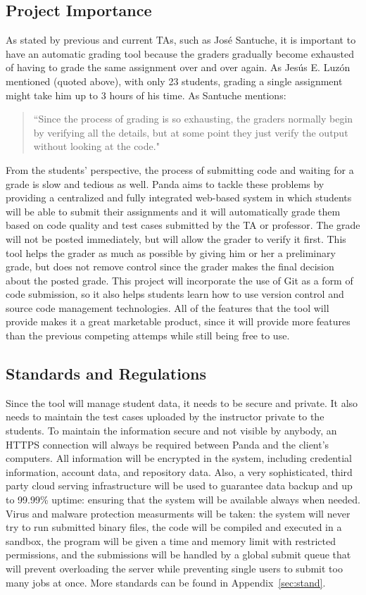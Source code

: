 \subsection{Project Importance}

As stated by previous and current TAs, such as José Santuche, it is important to
have an automatic grading tool because the graders gradually become exhausted of
having to grade the same assignment over and over again. As Jesús E. Luzón
mentioned (quoted above), with only 23 students, grading a single assignment
might take him up to 3 hours of his time. As Santuche mentions: \begin{quote}
``Since the process of grading is so exhausting, the graders normally begin by
verifying all the details, but at some point they just verify the output without
looking at the code." \end{quote} From the students' perspective, the process
of submitting code and waiting for a grade is slow and tedious as well. Panda
aims to tackle these problems by providing a centralized and fully integrated
web-based system in which students will be able to submit their assignments and
it will automatically grade them based on code quality and test cases submitted
by the TA or professor. The grade will not be posted immediately, but will allow
the grader to verify it first. This tool helps the grader as much as possible by
giving him or her a preliminary grade, but does not remove control since the
grader makes the final decision about the posted grade. This project will
incorporate the use of Git as a form of code submission, so it also helps
students learn how to use version control and source code management
technologies. All of the features that the tool will provide makes it a great
marketable product, since it will provide more features than the previous 
competing attemps while still being free to use. 

\subsection{Standards and Regulations} Since the tool will manage student data,
it needs to be secure and private. It also needs to maintain the test cases
uploaded by the instructor private to the students. To maintain the information
secure and not visible by anybody, an HTTPS connection will always be required
between Panda and the client's computers. All information will be encrypted in
the system, including credential information, account data, and repository data.
Also, a very sophisticated, third party cloud serving infrastructure will be
used to guarantee data backup and up to 99.99\% uptime: ensuring that the system
will be available always when needed. Virus and malware protection measurments
will be taken: the system will never try to run submitted binary files, the code
will be compiled and executed in a sandbox, the program will be given a time and
memory limit with restricted permissions, and the submissions will be handled by
a global submit queue that will prevent overloading the server while preventing
single users to submit too many jobs at once. More standards can be found in 
Appendix~\ref{sec:stand}.

